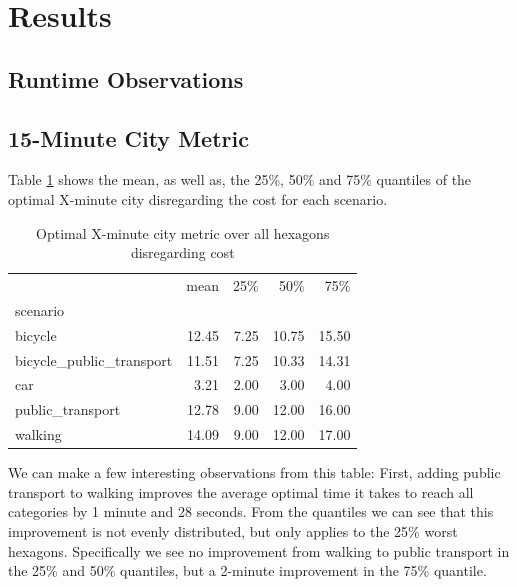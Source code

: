 \clearpage
\section{Results}
\label{sec:results}


\subsection{Runtime Observations}
\label{subsec:runtime_observations}

\subsection{15-Minute City Metric}
\label{subsec:15_minute_city_metric}

Table \ref{tab:optimal_x_minute_city_metric} shows the mean, as well as, the 25\%, 50\% and 75\% quantiles of the optimal X-minute city disregarding the cost for each scenario.

\begin{table}
  \caption{Optimal X-minute city metric over all hexagons disregarding cost}
  \label{tab:optimal_x_minute_city_metric}
  \begin{center}
    \begin{tabular}{lrrrr}
       & mean & 25\% & 50\% & 75\% \\
      scenario &  &  &  &  \\
      bicycle & 12.45 & 7.25 & 10.75 & 15.50 \\
      bicycle_public_transport & 11.51 & 7.25 & 10.33 & 14.31 \\
      car & 3.21 & 2.00 & 3.00 & 4.00 \\
      public_transport & 12.78 & 9.00 & 12.00 & 16.00 \\
      walking & 14.09 & 9.00 & 12.00 & 17.00 \\
    \end{tabular}
  \end{center}
\end{table}


We can make a few interesting observations from this table:
First, adding public transport to walking improves the average optimal time it takes to reach all categories by 1 minute and 28 seconds.
From the quantiles we can see that this improvement is not evenly distributed, but only applies to the 25\% worst hexagons.
Specifically we see no improvement from walking to public transport in the 25\% and 50\% quantiles, but a 2-minute improvement in the 75\% quantile.

